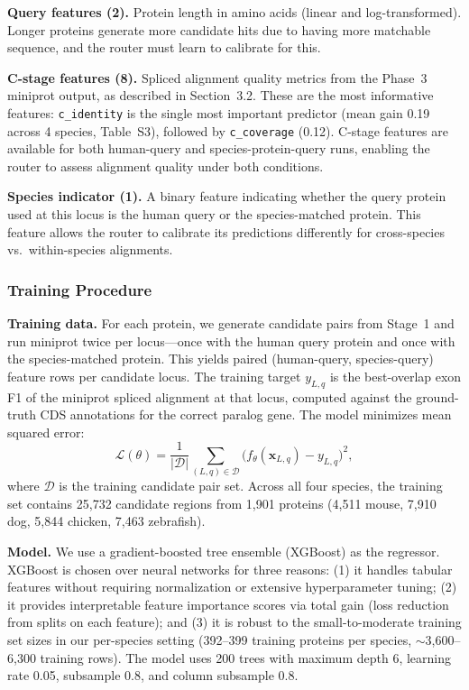 \textbf{Query features (2).} Protein length in amino acids (linear and log-transformed). Longer proteins generate more candidate hits due to having more matchable sequence, and the router must learn to calibrate for this.

\textbf{C-stage features (8).} Spliced alignment quality metrics from the Phase~3 miniprot output, as described in Section~3.2. These are the most informative features: \texttt{c\_identity} is the single most important predictor (mean gain 0.19 across 4 species, Table~S3), followed by \texttt{c\_coverage} (0.12). C-stage features are available for both human-query and species-protein-query runs, enabling the router to assess alignment quality under both conditions.

\textbf{Species indicator (1).} A binary feature indicating whether the query protein used at this locus is the human query or the species-matched protein. This feature allows the router to calibrate its predictions differently for cross-species vs.\ within-species alignments.

\subsubsection{Training Procedure}

\textbf{Training data.} For each protein, we generate candidate pairs from Stage~1 and run miniprot twice per locus---once with the human query protein and once with the species-matched protein. This yields paired (human-query, species-query) feature rows per candidate locus. The training target $y_{L,q}$ is the best-overlap exon F1 of the miniprot spliced alignment at that locus, computed against the ground-truth CDS annotations for the correct paralog gene. The model minimizes mean squared error:
\begin{equation}
\mathcal{L}(\theta) = \frac{1}{|\mathcal{D}|} \sum_{(L, q) \in \mathcal{D}} \bigl( f_\theta(\mathbf{x}_{L, q}) - y_{L, q} \bigr)^2,
\label{eq:mse_loss}
\end{equation}
where $\mathcal{D}$ is the training candidate pair set. Across all four species, the training set contains 25,732 candidate regions from 1,901 proteins (4,511 mouse, 7,910 dog, 5,844 chicken, 7,463 zebrafish).

\textbf{Model.} We use a gradient-boosted tree ensemble (XGBoost) as the regressor. XGBoost is chosen over neural networks for three reasons: (1) it handles tabular features without requiring normalization or extensive hyperparameter tuning; (2) it provides interpretable feature importance scores via total gain (loss reduction from splits on each feature); and (3) it is robust to the small-to-moderate training set sizes in our per-species setting (392--399 training proteins per species, $\sim$3,600--6,300 training rows). The model uses 200 trees with maximum depth 6, learning rate 0.05, subsample 0.8, and column subsample 0.8.

